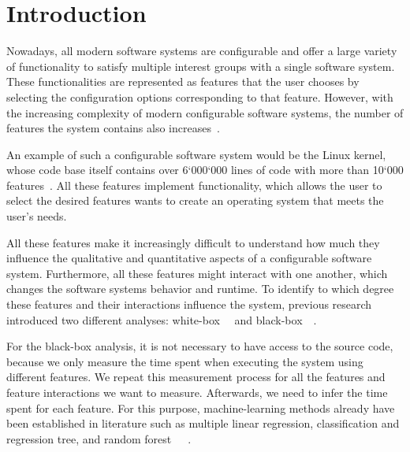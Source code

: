 \chapter{Introduction}\label{ch:introduction}

Nowadays, all modern software systems are configurable and offer a large variety of functionality to satisfy multiple 
interest groups with a single software system. These functionalities are represented as features that the user chooses by selecting the 
configuration options corresponding to that feature. However, with the increasing complexity of modern configurable software systems, 
the number of features the system contains also increases~\cite{Feature-Oriented-Software-Product-Lines}.

An example of such a configurable software system would be the Linux kernel, whose
code base itself contains over 6‘000‘000 lines of code with more than 10‘000 features~\cite{Linux-Kernel}.
All these features implement functionality, which allows the user to select the desired features
wants to create an operating system that meets the user’s needs.

All these features make it increasingly difficult to understand how much they influence the qualitative and quantitative
aspects of a configurable software system. 
Furthermore, all these features might interact with one another, which changes the software systems behavior and runtime. 
To identify to which degree these features and their interactions influence the system, previous research introduced two different analyses: 
white-box~\cite{Comprex}~\cite{ConfigCrusher} and black-box~\cite{Linear-Regression-Performance}~\cite{Performance-influence-models-for-highly-configurable-systems}.

For the black-box analysis, 
it is not necessary to have access to the source code, because we only measure the time spent when executing the system using different features. 
We repeat this measurement process for all the features and feature interactions we want to measure. 
Afterwards, we need to infer the time spent for each feature. 
For this purpose, machine-learning methods already have been established in literature such as multiple linear regression, 
classification and regression tree, and random forest~\cite{Interplay-of-sampling}~\cite{Performance-influence-models-for-highly-configurable-systems}~\cite{Linear-Regression-Performance}.


